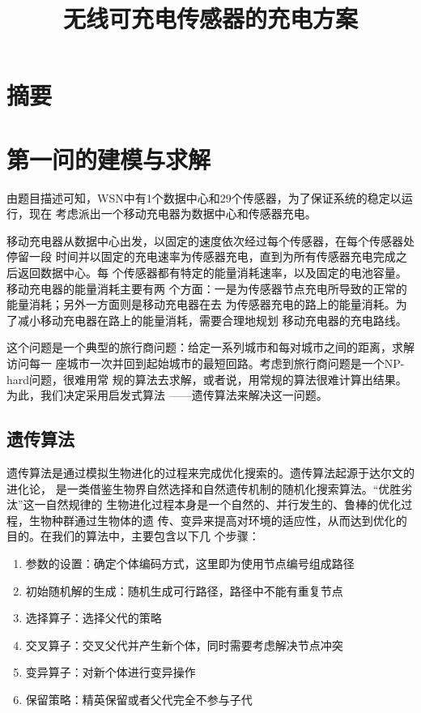 \documentclass{ctexart}
\title{无线可充电传感器的充电方案}
\date{}
\begin{document}
    \maketitle

    \section*{摘要}

    \section{第一问的建模与求解}
    由题目描述可知，WSN中有1个数据中心和29个传感器，为了保证系统的稳定以运行，现在
    考虑派出一个移动充电器为数据中心和传感器充电。

    移动充电器从数据中心出发，以固定的速度依次经过每个传感器，在每个传感器处停留一段
    时间并以固定的充电速率为传感器充电，直到为所有传感器充电完成之后返回数据中心。每
    个传感器都有特定的能量消耗速率，以及固定的电池容量。移动充电器的能量消耗主要有两
    个方面：一是为传感器节点充电所导致的正常的能量消耗；另外一方面则是移动充电器在去
    为传感器充电的路上的能量消耗。为了减小移动充电器在路上的能量消耗，需要合理地规划
    移动充电器的充电路线。

    这个问题是一个典型的旅行商问题：给定一系列城市和每对城市之间的距离，求解访问每一
    座城市一次并回到起始城市的最短回路。考虑到旅行商问题是一个NP-hard问题，很难用常
    规的算法去求解，或者说，用常规的算法很难计算出结果。为此，我们决定采用启发式算法
    ——遗传算法来解决这一问题。

    \subsection{遗传算法}
    遗传算法是通过模拟生物进化的过程来完成优化搜索的。遗传算法起源于达尔文的进化论，
    是一类借鉴生物界自然选择和自然遗传机制的随机化搜索算法。“优胜劣汰”这一自然规律的
    生物进化过程本身是一个自然的、并行发生的、鲁棒的优化过程，生物种群通过生物体的遗
    传、变异来提高对环境的适应性，从而达到优化的目的。在我们的算法中，主要包含以下几
    个步骤：
    \begin{enumerate}[a]
        \item 参数的设置：确定个体编码方式，这里即为使用节点编号组成路径
        \item 初始随机解的生成：随机生成可行路径，路径中不能有重复节点
        \item 选择算子：选择父代的策略
        \item 交叉算子：交叉父代并产生新个体，同时需要考虑解决节点冲突
        \item 变异算子：对新个体进行变异操作
        \item 保留策略：精英保留或者父代完全不参与子代
    \end{enumerate}
\end{document}

